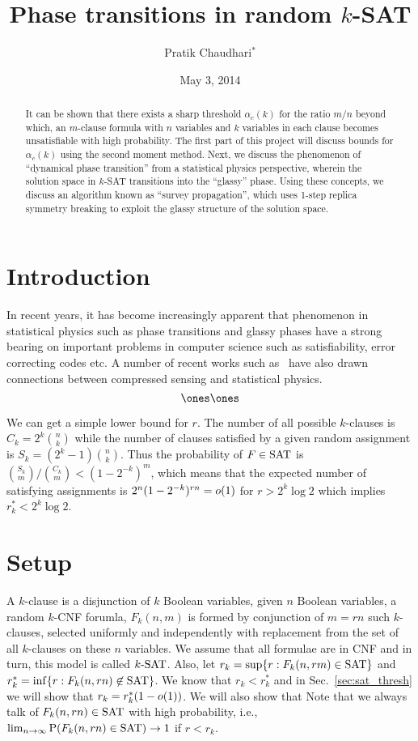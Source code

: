 \documentclass[letterpaper, 10pt, twocolumn, reqno, fleqn]{amsart}
\title{Phase transitions in random $k$-SAT}
\author{Pratik Chaudhari$^*$}
\date{May 3, 2014}
\begin{document}
\begin{abstract}
It can be shown that there exists a sharp threshold $\alpha_c(k)$ for the ratio $m/n$ beyond which, an $m$-clause formula with $n$ variables and $k$ variables in each clause becomes unsatisfiable with high probability. The first part of this project will discuss bounds for $\alpha_c(k)$ using the second moment method.
%
Next, we discuss the phenomenon of ``dynamical phase transition'' from a statistical physics perspective, wherein the solution space in $k$-SAT transitions into the ``glassy'' phase. Using these concepts, we discuss an algorithm known as ``survey propagation'', which uses 1-step replica symmetry breaking to exploit the glassy structure of the solution space.
\end{abstract}
\maketitle

\section{Introduction}
In recent years, it has become increasingly apparent that phenomenon in statistical physics such as phase transitions and glassy phases have a strong bearing on important problems in computer science such as satisfiability, error correcting codes etc. A number of recent works such as~\cite{krzakala2012statistical} have also drawn connections between compressed sensing and statistical physics.
$$
\ones \ones
$$


We can get a simple lower bound for $r$. The number of all possible $k$-clauses is $C_k = 2^k {n \choose k}$ while the number of clauses satisfied by a given random assignment is $S_k = (2^k -1) {n \choose k}$. Thus the probability of $F \in \textrm{SAT}$ is ${S_k \choose m}/{C_k \choose m} < (1-2^{-k})^m$, which means that the expected number of satisfying assignments is $2^n (1-2^{-k})^{rn} = o(1)$ for $r > 2^k \log 2$ which implies $r_k^* < 2^k \log 2$.

\section{Setup}
\label{sec:setup}
A $k$-clause is a disjunction of $k$ Boolean variables, given $n$ Boolean
variables, a random $k$-CNF forumla, $F_k(n, m)$ is formed by conjunction of $m = rn$ such $k$-clauses, selected uniformly and independently with
replacement from the set of all $k$-clauses on these $n$ variables. We assume that all formulae are in CNF and in turn, this model is called $k\textrm{-SAT}$. Also,
let $r_k = \sup \{ r: F_k(n, rm) \in \textrm{SAT} \}$ and $r_k^* = \inf \{ r: F_k(n, rn) \not\in \textrm{SAT} \}$. We know that $r_k < r_k^*$ and in Sec.~\ref{sec:sat_thresh}
 we will show that $r_k = r_k^*(1-o(1))$. We will also show that
Note that we always talk of $F_k(n,rn) \in \textrm{SAT}$ with high probability, i.e., $\lim_{n\to \infty} \textrm{P}(F_k(n,rn) \in \textrm{SAT}) \to 1$ if $r < r_k$.
\end{document}
